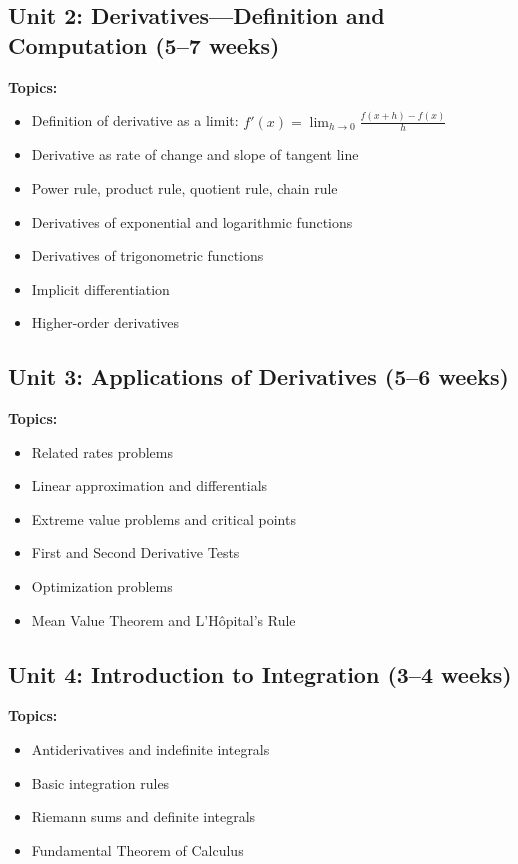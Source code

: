 \documentclass[12pt,oneside]{book}
\begin{document}
\subsection{Unit 2: Derivatives---Definition and Computation (5--7 weeks)}

\textbf{Topics:}
\begin{itemize}
    \item Definition of derivative as a limit: $f'(x) = \lim_{h \to 0} \frac{f(x+h)-f(x)}{h}$
    \item Derivative as rate of change and slope of tangent line
    \item Power rule, product rule, quotient rule, chain rule
    \item Derivatives of exponential and logarithmic functions
    \item Derivatives of trigonometric functions
    \item Implicit differentiation
    \item Higher-order derivatives
\end{itemize}

\subsection{Unit 3: Applications of Derivatives (5--6 weeks)}

\textbf{Topics:}
\begin{itemize}
    \item Related rates problems
    \item Linear approximation and differentials
    \item Extreme value problems and critical points
    \item First and Second Derivative Tests
    \item Optimization problems
    \item Mean Value Theorem and L'Hôpital's Rule
\end{itemize}

\subsection{Unit 4: Introduction to Integration (3--4 weeks)}

\textbf{Topics:}
\begin{itemize}
    \item Antiderivatives and indefinite integrals
    \item Basic integration rules
    \item Riemann sums and definite integrals
    \item Fundamental Theorem of Calculus
\end{itemize}
\end{document}
